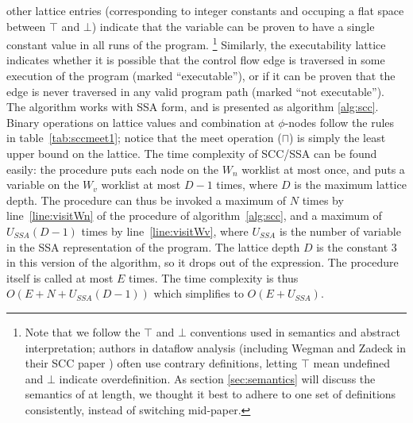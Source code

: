 \documentclass[12pt,titlepage,twoside]{article}
\newcommand{\meet}{\ensuremath{\sqcap}}
\begin{document}
other lattice entries (corresponding to integer constants and occuping
a flat space between $\top$ and $\bot$) indicate that the variable can
be proven to have a single constant value in all runs of the program.%
\footnote{Note that we follow the $\top$ and $\bot$ conventions used
in semantics and abstract interpretation; authors in dataflow analysis
(including Wegman and Zadeck in their SCC paper \cite{wegman91:scc})
often use contrary definitions, letting $\top$ mean undefined and
$\bot$ indicate overdefinition.  As section \ref{sec:semantics} will
discuss the semantics of \ssiplus at length, we thought it best to
adhere to one set of definitions consistently, instead of switching
mid-paper.}
Similarly, the executability lattice indicates whether it is possible
that the control flow edge is traversed in some execution of the
program (marked ``executable''), or if it can be proven that the edge
is never traversed in any valid program path (marked ``not
executable'').  The algorithm works with SSA form, and is presented
as algorithm \ref{alg:scc}.  Binary operations on lattice values and
combination at $\phi$-nodes follow the rules in
table~\ref{tab:sccmeet1}; notice that the meet operation ($\meet$) is
simply the least upper bound on the lattice.
The time complexity of SCC/SSA can be found
easily: the procedure  puts each node on the $W_n$
worklist at most once, and  puts a variable on the $W_v$
worklist at most $D-1$ times, where $D$ is the maximum lattice depth.
The  procedure can thus be invoked a maximum of $N$ times
by line~\ref{line:visitWn} of the  procedure of
algorithm~\ref{alg:scc}, and a maximum of $U_{SSA}(D-1)$ times by
line~\ref{line:visitWv}, where $U_{SSA}$ is the number of variable
 in the SSA representation of the program.  The lattice
depth $D$ is the constant 3 in this version of the algorithm, so it
drops out of the expression.  The  procedure itself is
called at most $E$ times.  The time complexity is thus
$O(E+N+U_{SSA}(D-1))$ which simplifies to $O(E+U_{SSA})$.
\end{document}
